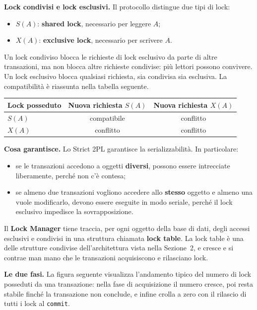 \documentclass[12pt]{extarticle}
\begin{document}
\medskip
\noindent \textbf{Lock condivisi e lock esclusivi.} Il protocollo distingue due tipi di lock:
\begin{itemize}
    \item $S(A)$: \textbf{shared lock}, necessario per leggere $A$;
    \item $X(A)$: \textbf{exclusive lock}, necessario per scrivere $A$.
\end{itemize}
Un lock condiviso blocca le richieste di lock esclusivo da parte di altre transazioni, ma non blocca altre richieste condivise: più lettori possono convivere. Un lock esclusivo blocca qualsiasi richiesta, sia condivisa sia esclusiva. La compatibilità è riassunta nella tabella seguente.

\begin{center}
\small
\begin{tabular}{@{}lcc@{}}
    \toprule
    \textbf{Lock posseduto} & \textbf{Nuova richiesta $S(A)$} & \textbf{Nuova richiesta $X(A)$} \\
    \midrule
    $S(A)$ & compatibile & conflitto \\
    \addlinespace
    $X(A)$ & conflitto & conflitto \\
    \bottomrule
\end{tabular}
\end{center}

\noindent \textbf{Cosa garantisce.} Lo Strict 2PL garantisce la serializzabilità. In particolare:
\begin{itemize}
    \item se le transazioni accedono a oggetti \textbf{diversi}, possono essere intrecciate liberamente, perché non c'è contesa;
    \item se almeno due transazioni vogliono accedere allo \textbf{stesso} oggetto e almeno una vuole modificarlo, devono essere eseguite in modo seriale, perché il lock esclusivo impedisce la sovrapposizione.
\end{itemize}
Il \textbf{Lock Manager} tiene traccia, per ogni oggetto della base di dati, degli accessi esclusivi e condivisi in una struttura chiamata \textbf{lock table}. La lock table è una delle strutture condivise dell'architettura vista nella Sezione~2, e cresce e si contrae man mano che le transazioni acquisiscono e rilasciano lock.

\medskip
\noindent \textbf{Le due fasi.} La figura seguente visualizza l'andamento tipico del numero di lock posseduti da una transazione: nella fase di acquisizione il numero cresce, poi resta stabile finché la transazione non conclude, e infine crolla a zero con il rilascio di tutti i lock al \texttt{commit}.
\end{document}
